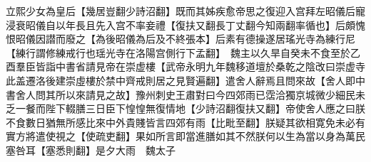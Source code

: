立熙少女為皇后【幾居豈翻少詩沼翻】既而其姊疾愈帝思之復迎入宫拜左昭儀后寵浸衰昭儀自以年長且先入宫不率妾禮【復扶又翻長丁丈翻今知兩翻率循也】后頗愧恨昭儀因譛而廢之【為後昭儀為后及不終張本】后素有德操遂居瑤光寺為練行尼【練行謂修練戒行也瑶光寺在洛陽宫側行下孟翻】　魏主以久旱自癸未不食至於乙酉羣臣皆詣中書省請見帝在崇虚樓【武帝永明九年魏移道壇於桑乾之陰改曰崇虚寺此盖遷洛後建崇虛樓於禁中齊戒則居之見賢遍翻】遣舍人辭焉且問來故【舍人即中書舍人問其所以來請見之故】豫州刺史王肅對曰今四郊雨已霑洽獨京城微少細民未乏一餐而陛下輟膳三日臣下惶惶無復情地【少詩沼翻復扶又翻】帝使舍人應之曰朕不食數日猶無所感比來中外貴賤皆言四郊有雨【比毗至翻】朕疑其欲相寛免未必有實方將遣使視之【使疏吏翻】果如所言即當進膳如其不然朕何以生為當以身為萬民塞咎耳【塞悉則翻】是夕大雨　魏太子